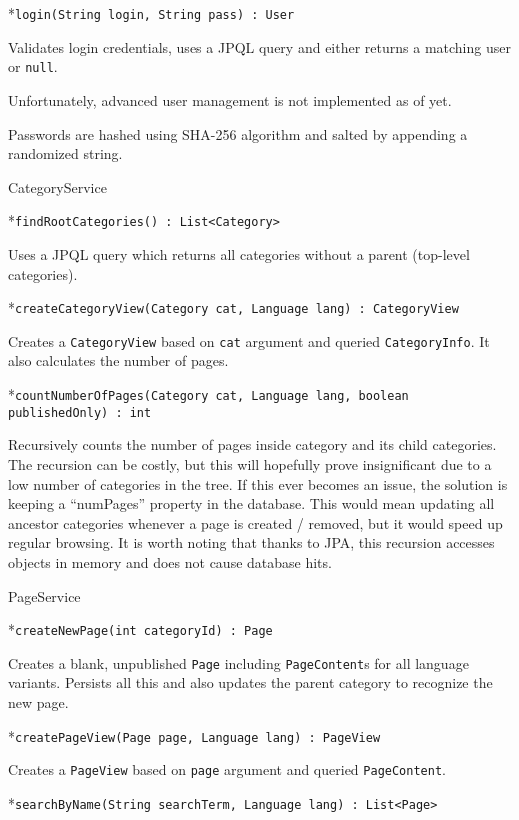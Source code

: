*{\tt login(String login, String pass) : User}

Validates login credentials, uses a JPQL query and either returns a matching user or {\tt null}.

\enditems

Unfortunately, advanced user management is not implemented as of yet.

Passwords are hashed using SHA-256 algorithm and salted by appending a randomized string.

\secc CategoryService

\begitems

*{\tt findRootCategories() : List<Category>}

Uses a JPQL query which returns all categories without a parent (top-level categories).

*{\tt createCategoryView(Category cat, Language lang) : CategoryView}

Creates a {\tt CategoryView} based on {\tt cat} argument and queried {\tt CategoryInfo}. It also calculates the number of pages.

*{\tt countNumberOfPages(Category cat, Language lang, boolean publishedOnly) : int}

Recursively counts the number of pages inside category and its child categories. The recursion can be costly, but this will hopefully prove insignificant due to a low number of categories in the tree. If this ever becomes an issue, the solution is keeping a “numPages” property in the database. This would mean updating all ancestor categories whenever a page is created / removed, but it would speed up regular browsing. It is worth noting that thanks to JPA, this recursion accesses objects in memory and does not cause database hits.

\enditems

\secc PageService

\begitems

*{\tt createNewPage(int categoryId) : Page}

Creates a blank, unpublished {\tt Page} including {\tt PageContent}s for all language variants. Persists all this and also updates the parent category to recognize the new page.

*{\tt createPageView(Page page, Language lang) : PageView}

Creates a {\tt PageView} based on {\tt page} argument and queried {\tt PageContent}.

*{\tt searchByName(String searchTerm, Language lang) : List<Page>}

